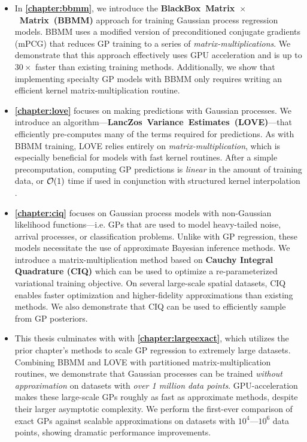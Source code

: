 \begin{itemize}
  \item In {\bf \cref{chapter:bbmm}}, we introduce the {\bf BlackBox~Matrix~$\times$~Matrix~(BBMM)} approach for training Gaussian process regression models.
    BBMM uses a modified version of preconditioned conjugate gradients (mPCG) that reduces GP training to a series of \emph{matrix-multiplications}.
    We demonstrate that this approach effectively uses GPU acceleration and is up to $30\times$ faster than existing training methods.
    Additionally, we show that implementing specialty GP models with BBMM only requires writing an efficient kernel matrix-multiplication routine.

  \item {\bf \cref{chapter:love}} focuses on making predictions with Gaussian processes.
    We introduce an algorithm---{\bf LancZos~Variance~Estimates~(LOVE)}---that efficiently pre-computes many of the terms required for predictions.
    As with BBMM training, LOVE relies entirely on \emph{matrix-multiplication}, which is especially beneficial for models with fast kernel routines.
    After a simple precomputation, computing GP predictions is \emph{linear} in the amount of training data, or $\bigo{1}$ time if used in conjunction with structured kernel interpolation \cite{wilson2015kernel}.

  \item {\bf \cref{chapter:ciq}} focuses on Gaussian process models with non-Gaussian likelihood functions---i.e. GPs that are used to model heavy-tailed noise, arrival processes, or classification problems.
    Unlike with GP regression, these models necessitate the use of approximate Bayesian inference methods.
    We introduce a matrix-multiplication method based on {\bf Cauchy Integral Quadrature (CIQ)} which can be used to optimize a re-parameterized variational training objective.
    On several large-scale spatial datasets, CIQ enables faster optimization and higher-fidelity approximations than existing methods.
    We also demonstrate that CIQ can be used to efficiently sample from GP posteriors.

  \item This thesis culminates with with {\bf \cref{chapter:largeexact}}, which utilizes the prior chapter's methods to scale GP regression to extremely large datasets.
    Combining BBMM and LOVE with partitioned matrix-multiplication routines, we demonstrate that Gaussian processes can be trained \emph{without approximation} on datasets with \emph{over 1 million data points}.
    GPU-acceleration makes these large-scale GPs roughly as fast as approximate methods, despite their larger asymptotic complexity.
    We perform the first-ever comparison of exact GPs against scalable approximations on datasets with $10^4$---$10^6$ data points, showing dramatic performance improvements.
\end{itemize}
